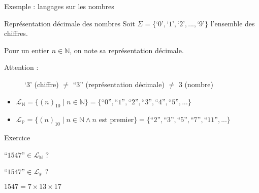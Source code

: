 
\begingroup

\begin{frame}{Exemple : langages sur les nombres}
  
  \begin{block}{Représentation décimale des nombres}
    Soit $\Sigma = \{\text{`0'}, \text{`1'}, \text{`2'}, ..., \text{`9'}\}$ l'ensemble des chiffres.
    
    Pour un entier $n \in \mathbb{N}$, on note  sa représentation décimale. 
    
    \begin{description}
    \item[\alert{Attention :}] `3' (chiffre) $\neq$ ``3'' (représentation décimale) $\neq$ 3 (nombre)
    \end{description}
    
    \begin{itemize}
    \item $\mathcal{L}_{\mathbb{N}} = \{(n)_{10} \mid n \in \mathbb{N}\} = \{\text{``0''},\text{``1''},\text{``2''},\text{``3''}, \text{``4''}, \text{``5''}, ...\}$
    \item<2-> $\mathcal{L}_{\mathbb{P}} = \{(n)_{10} \mid n \in \mathbb{N} \land n \text{ est premier}\} = \{\text{``2''},\text{``3''},\text{``5''}, \text{``7''}, \text{``11''}, ...\}$
    \end{itemize}
  \end{block}
  
  \vspace{3mm} 
  
  \begin{exampleblock}{Exercice}
    \begin{description}
    \item[Question :] $\text{``1547''} \in \mathcal{L}_{\mathbb{N}}$ ?
    \item<2->[Question :] $\text{``1547''} \in \mathcal{L}_{\mathbb{P}}$ ?
    \item<3->[Indication :] $1547 = 7 \times 13 \times 17$ 
    \end{description}
  \end{exampleblock}
  

\end{frame}

\endgroup
